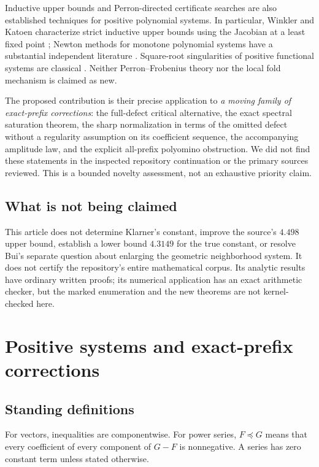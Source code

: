 \documentclass[11pt,a4paper]{article}
\theoremstyle{definition}
\theoremstyle{remark}
\begin{document}
Inductive upper bounds and Perron-directed certificate searches are also
established techniques for positive polynomial systems. In particular,
Winkler and Katoen characterize strict inductive upper bounds using the
Jacobian at a least fixed point \cite{satwk}; Newton methods for monotone
polynomial systems have a substantial independent literature \cite{satsey}.
Square-root singularities of positive functional systems are classical
\cite{satdrmota}. Neither Perron--Frobenius theory nor the local fold mechanism
is claimed as new.

The proposed contribution is their precise application to \emph{a moving
family of exact-prefix corrections}: the full-defect critical alternative,
the exact spectral saturation theorem, the sharp normalization in terms of
the omitted defect without a regularity assumption on its coefficient
sequence, the accompanying amplitude law, and the explicit all-prefix
polyomino obstruction. We did not find these statements in the inspected
repository continuation or the primary sources reviewed. This is a bounded
novelty assessment, not an exhaustive priority claim.

\subsection{What is not being claimed}
This article does not determine Klarner's constant, improve the source's
$4.498$ upper bound, establish a lower bound $4.3149$ for the true constant,
or resolve Bui's separate question about enlarging the geometric
neighborhood system. It does not certify the repository's entire
mathematical corpus. Its analytic results have ordinary written proofs;
its numerical application has an exact arithmetic checker, but the marked
enumeration and the new theorems are not kernel-checked here.

\section{Positive systems and exact-prefix corrections}
\label{kfp:sat:sec:setup}

\subsection{Standing definitions}
For vectors, inequalities are componentwise. For power series,
$F\preceq G$ means that every coefficient of every component of $G-F$ is
nonnegative. A series has zero constant term unless stated otherwise.
\end{document}
